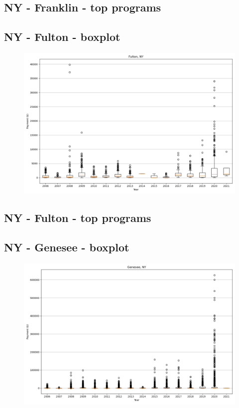 \subsection*{NY - Franklin - top programs}

\newpage
\subsection*{NY - Fulton - boxplot}
\begin{figure}[h]
\centering
\includegraphics[width=7in]{../output/boxplots/counties/Fulton-NY_boxplot.png}
\end{figure}


\subsection*{NY - Fulton - top programs}

\newpage
\subsection*{NY - Genesee - boxplot}
\begin{figure}[h]
\centering
\includegraphics[width=7in]{../output/boxplots/counties/Genesee-NY_boxplot.png}
\end{figure}


